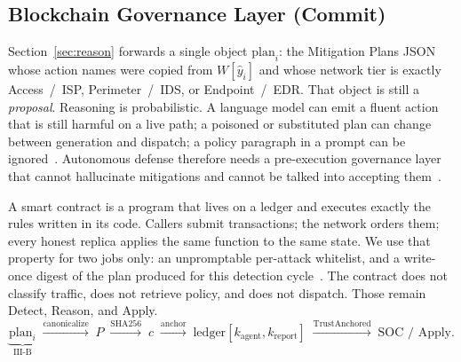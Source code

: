 
\subsection{Blockchain Governance Layer (Commit)}
\label{sec:commit}

Section~\ref{sec:reason} forwards a single object $\mathrm{plan}_i$: the Mitigation Plans JSON whose action names were copied from $W[\hat{y}_i]$ and whose network tier is exactly Access~/~ISP, Perimeter~/~IDS, or Endpoint~/~EDR. That object is still a \emph{proposal}. Reasoning is probabilistic. A language model can emit a fluent action that is still harmful on a live path; a poisoned or substituted plan can change between generation and dispatch; a policy paragraph in a prompt can be ignored~\cite{xi2023,lazer2026,chhabra2026}. Autonomous defense therefore needs a pre-execution governance layer that cannot hallucinate mitigations and cannot be talked into accepting them~\cite{karim2025,pendli2025,jan2025}.

A smart contract is a program that lives on a ledger and executes exactly the rules written in its code. Callers submit transactions; the network orders them; every honest replica applies the same function to the same state. We use that property for two jobs only: an unpromptable per-attack whitelist, and a write-once digest of the plan produced for this detection cycle~\cite{zhang2024exploit,chen2024,jin2024}. The contract does not classify traffic, does not retrieve policy, and does not dispatch. Those remain Detect, Reason, and Apply.
\begin{equation}
\underbrace{\mathrm{plan}_i}_{\text{III-B}}
\;\xrightarrow{\mathrm{canonicalize}}\;
P
\;\xrightarrow{\mathrm{SHA256}}\;
c
\;\xrightarrow{\mathrm{anchor}}\;
\mathrm{ledger}[k_{\mathrm{agent}},k_{\mathrm{report}}]
\;\xrightarrow{\mathrm{TrustAnchored}}\;
\text{SOC / Apply}.
\label{eq:commit-pipeline}
\end{equation}

